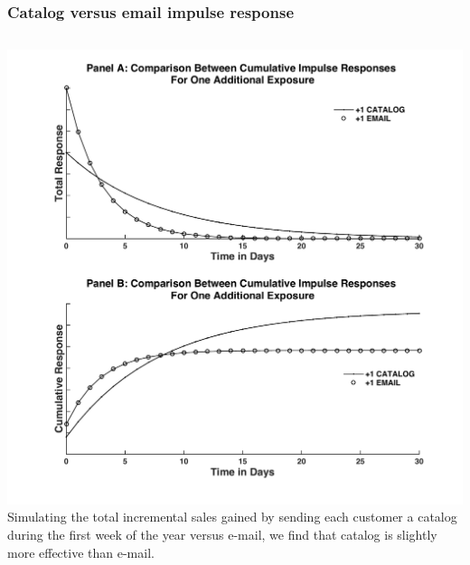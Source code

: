 \documentclass[10pt, aspectratio=169]{beamer}
\begin{document}
\begin{frame}
\frametitle{Catalog versus email impulse response}
\begin{columns}
\centering
\includegraphics[width=\textwidth]{images/CIR_CAT_EMAIL2.pdf} \\
\footnotesize
Simulating the total incremental sales gained by sending each customer a catalog during the first week of the year versus e-mail, we find that catalog is slightly more effective than e-mail. \\
\end{columns}
\end{frame}
\end{document}
